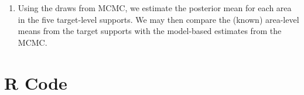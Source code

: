 \documentclass[12pt]{article}
\begin{document}
\begin{enumerate}
\item Using the draws from MCMC, we estimate the posterior mean for each area in the five target-level supports. We may then compare the (known) area-level means from the target supports with the model-based estimates from the MCMC.

\end{enumerate}



%

\clearpage

\appendix

\section{R Code}
\label{sec:code}
\end{document}
